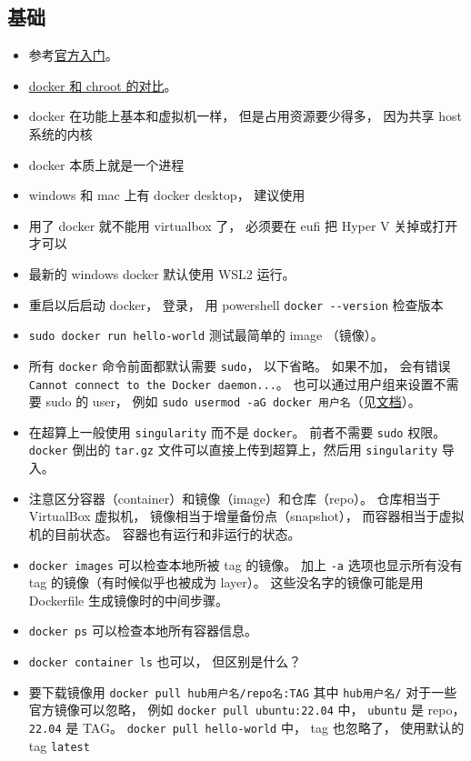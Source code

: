 \subsection{基础}
\begin{itemize}
\item 参考\href{https://docs.docker.com/get-started/}{官方入门}。
\item \href{https://devops.stackexchange.com/questions/2826/difference-between-chroot-and-docker}{docker 和 chroot 的对比}。
\item docker 在功能上基本和虚拟机一样， 但是占用资源要少得多， 因为共享 host 系统的内核
\item docker 本质上就是一个进程
\item windows 和 mac 上有 docker desktop， 建议使用
\item 用了 docker 就不能用 virtualbox 了， 必须要在 eufi 把 Hyper V 关掉或打开才可以
\item 最新的 windows docker 默认使用 WSL2 运行。
\item 重启以后启动 docker， 登录， 用 powershell \verb`docker --version` 检查版本
\item \verb`sudo docker run hello-world` 测试最简单的 image （镜像）。
\item 所有 \verb`docker` 命令前面都默认需要 \verb`sudo`， 以下省略。 如果不加， 会有错误 \verb`Cannot connect to the Docker daemon...`。 也可以通过用户组来设置不需要 sudo 的 user， 例如 \verb`sudo usermod -aG docker 用户名`（见\href{https://docs.docker.com/engine/install/linux-postinstall/}{文档}）。
\item 在超算上一般使用 \verb`singularity` 而不是 \verb`docker`。 前者不需要 \verb`sudo` 权限。 \verb`docker` 倒出的 \verb`tar.gz` 文件可以直接上传到超算上，然后用 \verb`singularity` 导入。
\item 注意区分容器（container）和镜像（image）和仓库（repo）。 仓库相当于 VirtualBox 虚拟机， 镜像相当于增量备份点（snapshot）， 而容器相当于虚拟机的目前状态。 容器也有运行和非运行的状态。
\item \verb`docker images` 可以检查本地所被 tag 的镜像。 加上 \verb`-a` 选项也显示所有没有 tag 的镜像（有时候似乎也被成为 layer）。 这些没名字的镜像可能是用 Dockerfile 生成镜像时的中间步骤。
\item \verb`docker ps` 可以检查本地所有容器信息。
\item \verb`docker container ls` 也可以， 但区别是什么？
\item 要下载镜像用 \verb`docker pull hub用户名/repo名:TAG` 其中 \verb`hub用户名/` 对于一些官方镜像可以忽略， 例如 \verb`docker pull ubuntu:22.04` 中， \verb`ubuntu` 是 repo， \verb`22.04` 是 TAG。 \verb`docker pull hello-world` 中， tag 也忽略了， 使用默认的 tag \verb`latest`

\end{itemize}
